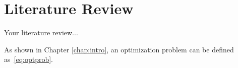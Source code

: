 % 

\chapter{Literature Review}
\label{chap:litreview}
Your literature review...

As shown in Chapter \ref{chap:intro}, an optimization problem can be defined as~\eqref{eq:optprob}.
